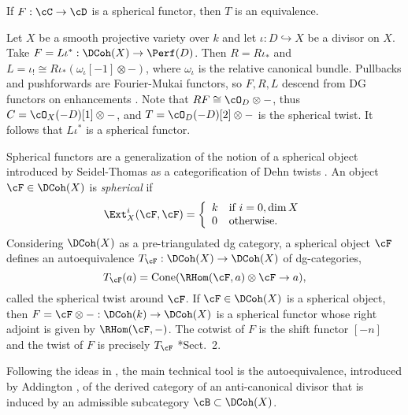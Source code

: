 \begin{thm} 
    If $F:\cC \to \cD$ is a spherical functor, then $T$ is an equivalence. 
\end{thm}

\begin{ex}
    Let $X$ be a smooth projective variety over $k$ and let $\iota: D \hookrightarrow X$ be a divisor on $X$. Take $F=L\iota ^\ast : \DCoh(X) \to \Perf(D)$. Then $R= R\iota_\ast$ and $L = \iota_!\cong R\iota_\ast \left(  \omega_\iota[-1] \otimes - \right )$, where $\omega_\iota$ is the relative canonical bundle.
    Pullbacks and pushforwards are Fourier-Mukai functors, so $F,R,L$ descend from DG functors on enhancements \cite{T07}. Note that $RF \cong \cO_D \otimes -$, thus $C = \cO_X(-D) [1]\otimes -$, and $T = \cO_D(-D)[2] \otimes -$ is the spherical twist. It follows that $L\iota^\ast$ is a spherical functor.
\end{ex}

Spherical functors are a generalization of the notion of a spherical object introduced by Seidel-Thomas as a categorification of Dehn twists \cite{ST01}. An object $\cF \in \DCoh(X)$ is \emph{spherical} if 
\[
    \Ext^i_X ( \cF, \cF ) = \left\{
    \begin{array}{ll}
         k & \text{if } i = 0, \dim X \\
         0 & \text{otherwise.}
    \end{array} \right. 
\]
Considering $\DCoh(X)$ as a pre-triangulated dg category, a spherical object $\cF$ defines an autoequivalence $T_\cF: \DCoh(X) \to \DCoh(X)$ of dg-categories,
\[
    T_\cF(a) = \text{Cone} ( \RHom(\cF, a) \otimes \cF \to a),
\]
called the spherical twist around $\cF$. If $\cF \in \DCoh(X)$ is a spherical object, then $F = \cF \otimes - : \DCoh(k) \to \DCoh(X)$ is a spherical functor whose right adjoint is given by $\RHom(\cF, -)$. The cotwist of $F$ is the shift functor $[-n]$ and the twist of $F$ is precisely $T_\cF$ \cite{A16}*{Sect.~2}.

Following the ideas in \cite{P23}, the main technical tool is the autoequivalence, introduced by Addington \cite{A16}, of the derived category of an anti-canonical divisor that is induced by an admissible subcategory $\cB \subset \DCoh(X)$.

